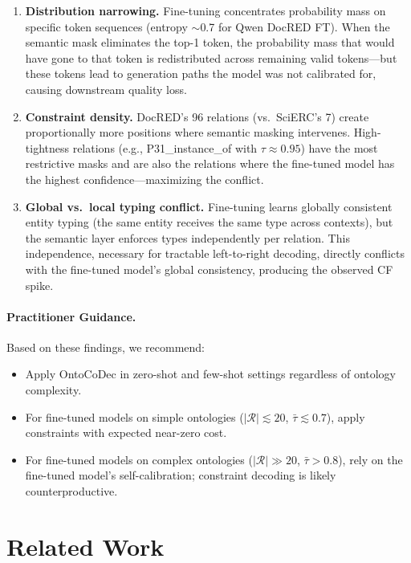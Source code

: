 \documentclass[11pt,a4paper]{article}
\newcommand{\system}{OntoCoDec}
\newcommand{\tight}{\tau}
\begin{document}
\begin{enumerate}
    \item \textbf{Distribution narrowing.} Fine-tuning concentrates probability mass on specific token sequences (entropy $\sim$0.7 for Qwen DocRED FT). When the semantic mask eliminates the top-1 token, the probability mass that would have gone to that token is redistributed across remaining valid tokens---but these tokens lead to generation paths the model was not calibrated for, causing downstream quality loss.

    \item \textbf{Constraint density.} DocRED's 96 relations (vs.\ SciERC's 7) create proportionally more positions where semantic masking intervenes. High-tightness relations (e.g., P31\_instance\_of with $\tight \approx 0.95$) have the most restrictive masks and are also the relations where the fine-tuned model has the highest confidence---maximizing the conflict.

    \item \textbf{Global vs.\ local typing conflict.} Fine-tuning learns globally consistent entity typing (the same entity receives the same type across contexts), but the semantic layer enforces types independently per relation. This independence, necessary for tractable left-to-right decoding, directly conflicts with the fine-tuned model's global consistency, producing the observed CF spike.
\end{enumerate}

\paragraph{Practitioner Guidance.} Based on these findings, we recommend:
\begin{itemize}
    \item Apply \system{} in zero-shot and few-shot settings regardless of ontology complexity.
    \item For fine-tuned models on simple ontologies ($|\mathcal{R}| \lesssim 20$, $\bar{\tight} \lesssim 0.7$), apply constraints with expected near-zero cost.
    \item For fine-tuned models on complex ontologies ($|\mathcal{R}| \gg 20$, $\bar{\tight} > 0.8$), rely on the fine-tuned model's self-calibration; constraint decoding is likely counterproductive.
\end{itemize}

\section{Related Work}
\end{document}
